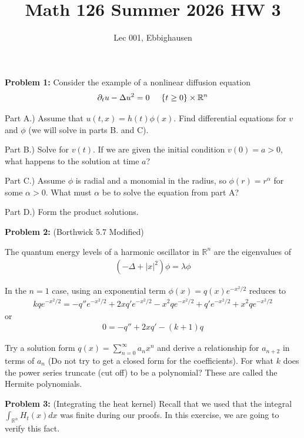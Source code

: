 \documentclass{article}
\title{Math 126 Summer 2026 HW 3}
\author{Lec 001, Ebbighausen}
\newcommand{\R}{{\mathbb{R}}}
\newcommand{\pd}{\partial}
\begin{document}
	\pagestyle{fancy}
	\fancyfoot{} 
	
	\maketitle
	
	\textbf{Problem 1:} Consider the example of a nonlinear diffusion equation 
	\begin{align*}
		\pd_{t} u - \Delta u^2 =0 \hspace{0.5cm} \{t \geq 0\} \times \R^{n} 
	\end{align*}
	
	Part A.) Assume that $u(t,x) = h(t)\phi(x)$. Find differential equations for $v$ and $\phi$ (we will solve in parts B. and C). 
	
	Part B.) Solve for $v(t)$. If we are given the initial condition $v(0) = a>0$, what happens to the solution at time $a$?
	
	Part C.) Assume $\phi$ is radial and a monomial in the radius, so $\phi(r) = r^{\alpha}$ for some $\alpha > 0$. What must $\alpha$ be to solve the equation from part A? 
	
	Part D.) Form the product solutions. 
	
	\textbf{Problem 2:} (Borthwick 5.7 Modified)
	
	The quantum energy levels of a harmonic oscillator in $\R^{n}$ are the eigenvalues of 
	\begin{align*}
		(-\Delta + |x|^{2}) \phi = \lambda \phi
	\end{align*}
	
	In the $n=1$ case, using an exponential term $\phi(x) = q(x)e^{-x^{2}/2}$ reduces to 
	\begin{align*}
		k qe^{-x^{2}/2} = -q''e^{-x^{2}/2} +2xq'e^{-x^{2}/2} - x^{2}qe^{-x^{2}/2} +q'e^{-x^{2}/2} + x^{2}qe^{-x^{2}/2}
	\end{align*}
	or
	\begin{align*}
		0 = -q'' +2xq' - (k+1)q
	\end{align*}
	
	Try a solution form $q(x) = \sum_{n=0}^{\infty} a_{n}x^{n}$ and derive a relationship for $a_{n+2}$ in terms of $a_{n}$ (Do not try to get a closed form for the coefficients). For what $k$ does the power series truncate (cut off) to be a polynomial? These are called the Hermite polynomials. 
	
	
	
	\textbf{Problem 3:} (Integrating the heat kernel) Recall that we used that the integral $\int_{\R^{n}} H_{t}(x) dx$ was finite during our proofs. In this exercise, we are going to verify this fact.
	
\end{document}
